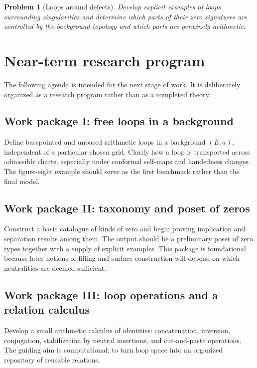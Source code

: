 \documentclass[11pt]{article}
\newtheorem{problem}{Problem}[section]
\begin{document}
\begin{problem}[Loops around defects]
Develop explicit examples of loops surrounding singularities and determine which parts of their zero signatures are controlled by the background topology and which parts are genuinely arithmetic.
\end{problem}

\section{Near-term research program}

The following agenda is intended for the next stage of work. It is deliberately organized as a research program rather than as a completed theory.

\subsection{Work package I: free loops in a background}

Define basepointed and unbased arithmetic loops in a background $(E,a)$, independent of a particular chosen grid. Clarify how a loop is transported across admissible charts, especially under conformal self-maps and handedness changes. The figure-eight example should serve as the first benchmark rather than the final model.

\subsection{Work package II: taxonomy and poset of zeros}

Construct a basic catalogue of kinds of zero and begin proving implication and separation results among them. The output should be a preliminary poset of zero types together with a supply of explicit examples. This package is foundational because later notions of filling and surface construction will depend on which neutralities are deemed sufficient.

\subsection{Work package III: loop operations and a relation calculus}

Develop a small arithmetic calculus of identities: concatenation, inversion, conjugation, stabilization by neutral insertions, and cut-and-paste operations. The guiding aim is computational: to turn loop space into an organized repository of reusable relations.
\end{document}
